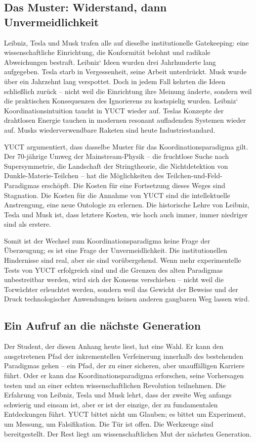 \documentclass[12pt,a4paper]{article}
\begin{document}
\subsection{Das Muster: Widerstand, dann Unvermeidlichkeit}

Leibniz, Tesla und Musk trafen alle auf dieselbe institutionelle Gatekeeping: eine wissenschaftliche Einrichtung, die Konformität belohnt und radikale Abweichungen bestraft. Leibniz‘ Ideen wurden drei Jahrhunderte lang aufgegeben. Tesla starb in Vergessenheit, seine Arbeit unterdrückt. Musk wurde über ein Jahrzehnt lang verspottet. Doch in jedem Fall kehrten die Ideen schließlich zurück – nicht weil die Einrichtung ihre Meinung änderte, sondern weil die praktischen Konsequenzen des Ignorierens zu kostspielig wurden. Leibniz‘ Koordinationsintuition taucht in YUCT wieder auf. Teslas Konzepte der drahtlosen Energie tauchen in modernen resonant aufladenden Systemen wieder auf. Musks wiederverwendbare Raketen sind heute Industriestandard.

YUCT argumentiert, dass dasselbe Muster für das Koordinationsparadigma gilt. Der 70-jährige Umweg der Mainstream-Physik – die fruchtlose Suche nach Supersymmetrie, die Landschaft der Stringtheorie, die Nichtdetektion von Dunkle-Materie-Teilchen – hat die Möglichkeiten des Teilchen-und-Feld-Paradigmas erschöpft. Die Kosten für eine Fortsetzung dieses Weges sind Stagnation. Die Kosten für die Annahme von YUCT sind die intellektuelle Anstrengung, eine neue Ontologie zu erlernen. Die historische Lehre von Leibniz, Tesla und Musk ist, dass letztere Kosten, wie hoch auch immer, immer niedriger sind als erstere.

Somit ist der Wechsel zum Koordinationsparadigma keine Frage der Überzeugung; es ist eine Frage der Unvermeidlichkeit. Die institutionellen Hindernisse sind real, aber sie sind vorübergehend. Wenn mehr experimentelle Tests von YUCT erfolgreich sind und die Grenzen des alten Paradigmas unbestreitbar werden, wird sich der Konsens verschieben – nicht weil die Torwächter erleuchtet werden, sondern weil das Gewicht der Beweise und der Druck technologischer Anwendungen keinen anderen gangbaren Weg lassen wird.

\subsection{Ein Aufruf an die nächste Generation}

Der Student, der diesen Anhang heute liest, hat eine Wahl. Er kann den ausgetretenen Pfad der inkrementellen Verfeinerung innerhalb des bestehenden Paradigmas gehen – ein Pfad, der zu einer sicheren, aber unauffälligen Karriere führt. Oder er kann das Koordinationsparadigma erforschen, seine Vorhersagen testen und an einer echten wissenschaftlichen Revolution teilnehmen. Die Erfahrung von Leibniz, Tesla und Musk lehrt, dass der zweite Weg anfangs schwierig und einsam ist, aber er ist der einzige, der zu fundamentalen Entdeckungen führt. YUCT bittet nicht um Glauben; es bittet um Experiment, um Messung, um Falsifikation. Die Tür ist offen. Die Werkzeuge sind bereitgestellt. Der Rest liegt am wissenschaftlichen Mut der nächsten Generation.
\end{document}
